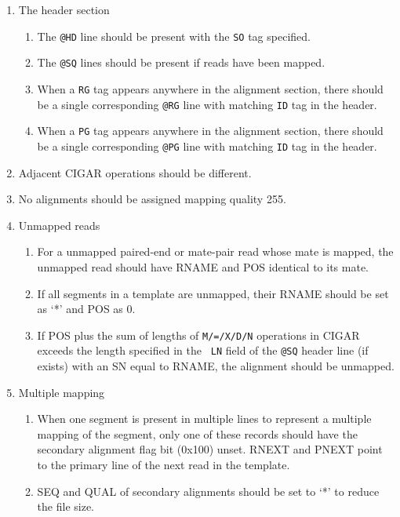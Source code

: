 \documentclass[10pt]{article}
\begin{document}
\begin{enumerate}
\item The header section
  \begin{enumerate}[label=\arabic*]
  \item The {\tt @HD} line should be present with the {\tt SO} tag specified.
  \item The {\tt @SQ} lines should be present if reads have been mapped.
  \item When a {\tt RG} tag appears anywhere in the alignment section,
    there should be a single corresponding {\tt @RG} line with matching
    {\tt ID} tag in the header.
  \item When a {\tt PG} tag appears anywhere in the alignment section,
    there should be a single corresponding {\tt @PG} line with matching
    {\tt ID} tag in the header.
  \end{enumerate}
\item Adjacent CIGAR operations should be different.
\item No alignments should be assigned mapping quality 255.
\item Unmapped reads
  \begin{enumerate}[label=\arabic*]
  \item For a unmapped paired-end or mate-pair read whose mate is
    mapped, the unmapped read should have {\sf RNAME} and {\sf POS}
    identical to its mate.
  \item If all segments in a template are unmapped, their {\sf RNAME}
    should be set as `*' and {\sf POS} as 0.
  \item If {\sf POS} plus the sum of lengths of {\tt M/=/X/D/N}
    operations in {\sf CIGAR} exceeds the length specified in the {\tt
      LN} field of the {\tt @SQ} header line (if exists) with an SN
    equal to {\sf RNAME}, the alignment should be unmapped.
  \end{enumerate}
\item Multiple mapping
  \begin{enumerate}[label=\arabic*]
  \item When one segment is present in multiple lines to represent a multiple
	mapping of the segment, only one of these records should have the secondary
	alignment flag bit (0x100) unset. {\sf RNEXT} and {\sf PNEXT} point to the
	primary line of the next read in the template.
  \item {\sf SEQ} and {\sf QUAL} of secondary alignments should be set
    to `*' to reduce the file size.
  \end{enumerate}

\end{enumerate}
\end{document}
